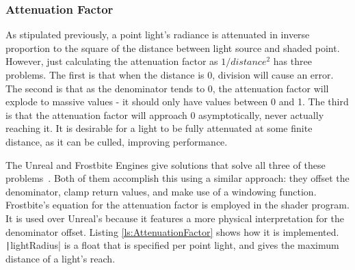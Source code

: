 \vspace{-0.1cm}


\vspace{-0.3cm}

\subsubsection{Attenuation Factor}

As stipulated previously, a point light's radiance is attenuated in inverse proportion to the square of the distance between light source and shaded point. However, just calculating the attenuation factor as \begin{math}1 / distance^2\end{math} has three problems. The first is that when the distance is 0, division will cause an error. The second is that as the denominator tends to 0, the attenuation factor will explode to massive values - it should only have values between 0 and 1. The third is that the attenuation factor will approach 0 asymptotically, never actually reaching it. It is desirable for a light to be fully attenuated at some finite distance, as it can be culled, improving performance.

The Unreal and Frostbite Engines give solutions that solve all three of these problems~\cite{RealShadingInUnreal}\cite{MovingFrostbitetoPBR}. Both of them accomplish this using a similar approach: they offset the denominator, clamp return values, and make use of a windowing function. Frostbite's equation for the attenuation factor is employed in the shader program. It is used over Unreal's because it features a more physical interpretation for the denominator offset. Listing \ref{ls:AttenuationFactor} shows how it is implemented. \texttt|lightRadius| is a float that is specified per point light, and gives the maximum distance of a light's reach.

